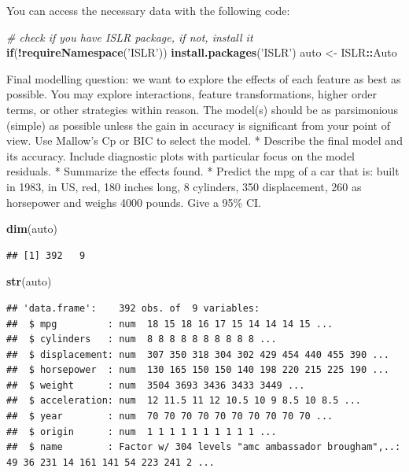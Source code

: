 \documentclass[]{article}
\newenvironment{Shaded}{\begin{snugshade}}{\end{snugshade}}
\newcommand{\KeywordTok}[1]{\textcolor[rgb]{0.13,0.29,0.53}{\textbf{#1}}}
\newcommand{\StringTok}[1]{\textcolor[rgb]{0.31,0.60,0.02}{#1}}
\newcommand{\CommentTok}[1]{\textcolor[rgb]{0.56,0.35,0.01}{\textit{#1}}}
\newcommand{\ControlFlowTok}[1]{\textcolor[rgb]{0.13,0.29,0.53}{\textbf{#1}}}
\newcommand{\OperatorTok}[1]{\textcolor[rgb]{0.81,0.36,0.00}{\textbf{#1}}}
\newcommand{\NormalTok}[1]{#1}
\begin{document}
You can access the necessary data with the following code:

\begin{Shaded}
\begin{Highlighting}[]
\CommentTok{# check if you have ISLR package, if not, install it}
\ControlFlowTok{if}\NormalTok{(}\OperatorTok{!}\KeywordTok{requireNamespace}\NormalTok{(}\StringTok{'ISLR'}\NormalTok{)) }\KeywordTok{install.packages}\NormalTok{(}\StringTok{'ISLR'}\NormalTok{) }
\NormalTok{auto <-}\StringTok{ }\NormalTok{ISLR}\OperatorTok{::}\NormalTok{Auto}
\end{Highlighting}
\end{Shaded}

Final modelling question: we want to explore the effects of each feature
as best as possible. You may explore interactions, feature
transformations, higher order terms, or other strategies within reason.
The model(s) should be as parsimonious (simple) as possible unless the
gain in accuracy is significant from your point of view. Use Mallow's Cp
or BIC to select the model. * Describe the final model and its accuracy.
Include diagnostic plots with particular focus on the model residuals. *
Summarize the effects found. * Predict the mpg of a car that is: built
in 1983, in US, red, 180 inches long, 8 cylinders, 350 displacement, 260
as horsepower and weighs 4000 pounds. Give a 95\% CI.

\begin{Shaded}
\begin{Highlighting}[]
\KeywordTok{dim}\NormalTok{(auto)}
\end{Highlighting}
\end{Shaded}

\begin{verbatim}
## [1] 392   9
\end{verbatim}

\begin{Shaded}
\begin{Highlighting}[]
\KeywordTok{str}\NormalTok{(auto)}
\end{Highlighting}
\end{Shaded}

\begin{verbatim}
## 'data.frame':    392 obs. of  9 variables:
##  $ mpg         : num  18 15 18 16 17 15 14 14 14 15 ...
##  $ cylinders   : num  8 8 8 8 8 8 8 8 8 8 ...
##  $ displacement: num  307 350 318 304 302 429 454 440 455 390 ...
##  $ horsepower  : num  130 165 150 150 140 198 220 215 225 190 ...
##  $ weight      : num  3504 3693 3436 3433 3449 ...
##  $ acceleration: num  12 11.5 11 12 10.5 10 9 8.5 10 8.5 ...
##  $ year        : num  70 70 70 70 70 70 70 70 70 70 ...
##  $ origin      : num  1 1 1 1 1 1 1 1 1 1 ...
##  $ name        : Factor w/ 304 levels "amc ambassador brougham",..: 49 36 231 14 161 141 54 223 241 2 ...
\end{verbatim}
\end{document}
